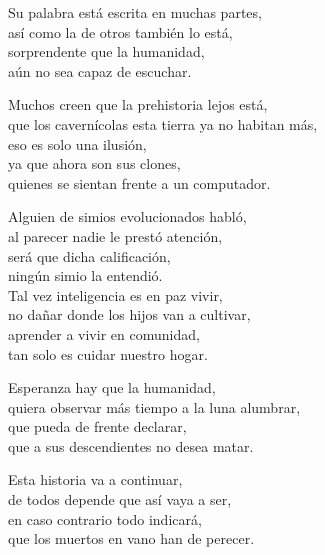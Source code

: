 \begin{center}
\vspace{4em} 
Su palabra está escrita en muchas partes,\\ 
así como la de otros también lo está,\\ 
sorprendente que la humanidad,\\ 
aún no sea capaz de escuchar.

\vspace{1em} 
Muchos creen que la prehistoria lejos está,\\ 
que los cavernícolas esta tierra ya no habitan más,\\ 
eso es solo una ilusión,\\ 
ya que ahora son sus clones,\\ 
quienes se sientan frente a un computador.

\vspace{1em} 
Alguien de simios evolucionados habló,\\ 
al parecer nadie le prestó atención,\\ 
será que dicha calificación,\\ 
ningún simio la entendió.\\ 

\vspace{1em}
Tal vez inteligencia es en paz vivir,\\ 
no dañar donde los hijos van a cultivar,\\ 
aprender a vivir en comunidad,\\ 
tan solo es cuidar nuestro hogar.

\vspace{1em} 
Esperanza hay que la humanidad,\\ 
quiera observar más tiempo a la luna alumbrar,\\ 
que pueda de frente declarar,\\ 
que a sus descendientes no desea matar.

\vspace{1em} 
Esta historia va a continuar,\\ 
de todos depende que así vaya a ser,\\ 
en caso contrario todo indicará,\\ 
que los muertos en vano han de perecer.

\end{center}




